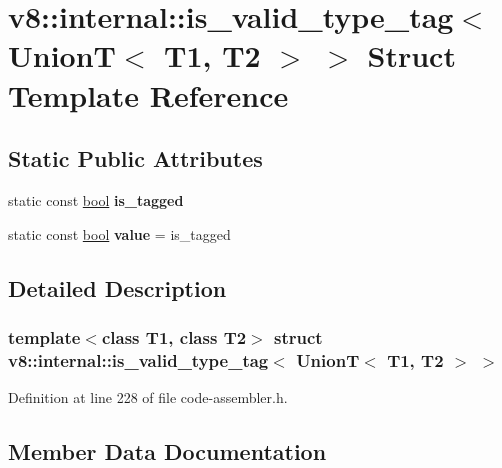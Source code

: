 \hypertarget{structv8_1_1internal_1_1is__valid__type__tag_3_01UnionT_3_01T1_00_01T2_01_4_01_4}{}\section{v8\+:\+:internal\+:\+:is\+\_\+valid\+\_\+type\+\_\+tag$<$ UnionT$<$ T1, T2 $>$ $>$ Struct Template Reference}
\label{structv8_1_1internal_1_1is__valid__type__tag_3_01UnionT_3_01T1_00_01T2_01_4_01_4}
\subsection*{Static Public Attributes}
\begin{DoxyCompactItemize}
\item 
static const \mbox{\hyperlink{classbool}{bool}} {\bfseries is\+\_\+tagged}
\item 
\mbox{\label{structv8_1_1internal_1_1is__valid__type__tag_3_01UnionT_3_01T1_00_01T2_01_4_01_4_aaaa4322b4bd262cb65b862dd737455d1}} 
static const \mbox{\hyperlink{classbool}{bool}} {\bfseries value} = is\+\_\+tagged
\end{DoxyCompactItemize}


\subsection{Detailed Description}
\subsubsection*{template$<$class T1, class T2$>$\newline
struct v8\+::internal\+::is\+\_\+valid\+\_\+type\+\_\+tag$<$ Union\+T$<$ T1, T2 $>$ $>$}



Definition at line 228 of file code-\/assembler.\+h.



\subsection{Member Data Documentation}
\mbox{\label{structv8_1_1internal_1_1is__valid__type__tag_3_01UnionT_3_01T1_00_01T2_01_4_01_4_a08f64843ad79a97fc2a0be5736990028}} 
